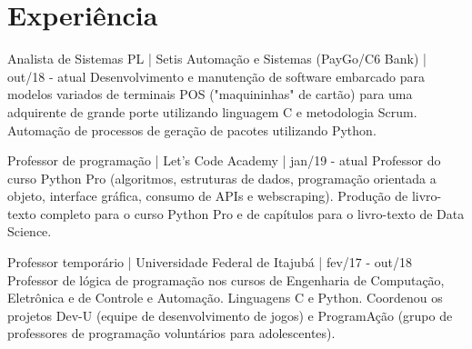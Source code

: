 \documentclass[]{cv-style}          %
\begin{document}
\section{Experiência}
\vspace{-0.3cm}
\begin{entrylist}


\entry
{}
{Analista de Sistemas PL | Setis Automação e Sistemas (PayGo/C6 Bank) | out/18 - atual}
{\vspace{-0.01cm}}
{Desenvolvimento e manutenção de software embarcado para modelos variados de terminais POS ("maquininhas" de cartão) para uma adquirente de grande porte utilizando linguagem C e metodologia Scrum. Automação de processos de geração de pacotes utilizando Python.}
{}

\entry
  {}
  {Professor de programação | Let's Code Academy | jan/19 - atual}
  {\vspace{-0.01cm}}
{Professor do curso Python Pro (algoritmos, estruturas de dados, programação orientada a objeto, interface gráfica, consumo de APIs e webscraping). Produção de livro-texto completo para o curso Python Pro e de capítulos para o livro-texto de Data Science.}
 {} %

\entry
  {}
  {Professor temporário | Universidade Federal de Itajubá | fev/17 - out/18}
{\vspace{-0.01cm}}
{ Professor de lógica de programação nos cursos de Engenharia de Computação, Eletrônica e de Controle e Automação. Linguagens C e Python. Coordenou os projetos Dev-U (equipe de desenvolvimento de jogos) e ProgramAção (grupo de professores de programação voluntários para adolescentes).}
\end{entrylist}
{\vspace{-0.4cm}}
\end{document}

